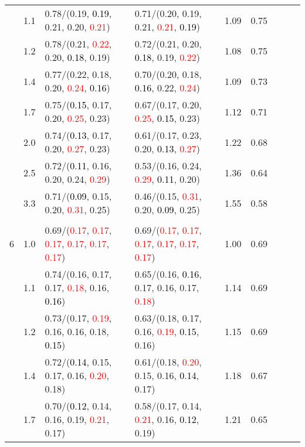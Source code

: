 \documentclass[10pt,a4paper]{report}
\begin{document}
\begin{table}[!htbp]
\begin{center}
{\begin{tabular}{ccllccccc}
			&1.1&0.78/(0.19, \textcolor{black}{0.19}, 0.21, 0.20, \textcolor{red}{0.21})&0.71/(0.20, 0.19, 0.21, \textcolor{red}{0.21}, \textcolor{black}{0.19})&1.09&0.75\\
			&1.2&0.78/(0.21, \textcolor{red}{0.22}, 0.20, \textcolor{black}{0.18}, 0.19)&0.72/(0.21, 0.20, \textcolor{black}{0.18}, 0.19, \textcolor{red}{0.22})&1.08&0.75\\
			&1.4&0.77/(0.22, 0.18, 0.20, \textcolor{red}{0.24}, \textcolor{black}{0.16})&0.70/(0.20, 0.18, \textcolor{black}{0.16}, 0.22, \textcolor{red}{0.24})&1.09&0.73\\
			&1.7&0.75/(\textcolor{black}{0.15}, 0.17, 0.20, \textcolor{red}{0.25}, 0.23)&0.67/(0.17, 0.20, \textcolor{red}{0.25}, \textcolor{black}{0.15}, 0.23)&1.12&0.71\\
			&2.0&0.74/(\textcolor{black}{0.13}, 0.17, 0.20, \textcolor{red}{0.27}, 0.23)&0.61/(0.17, 0.23, 0.20, \textcolor{black}{0.13}, \textcolor{red}{0.27})&1.22&0.68\\
			&2.5&0.72/(\textcolor{black}{0.11}, 0.16, 0.20, 0.24, \textcolor{red}{0.29})&0.53/(0.16, 0.24, \textcolor{red}{0.29}, \textcolor{black}{0.11}, 0.20)&1.36&0.64\\
			&3.3&0.71/(\textcolor{black}{0.09}, 0.15, 0.20, \textcolor{red}{0.31}, 0.25)&0.46/(0.15, \textcolor{red}{0.31}, 0.20, \textcolor{black}{0.09}, 0.25)&1.55&0.58\\
			&&&&\\
			6			&1.0&0.69/(\textcolor{red}{0.17}, \textcolor{red}{0.17}, \textcolor{red}{0.17}, \textcolor{red}{0.17}, \textcolor{red}{0.17}, \textcolor{red}{0.17})&0.69/(\textcolor{red}{0.17}, \textcolor{red}{0.17}, \textcolor{red}{0.17}, \textcolor{red}{0.17}, \textcolor{red}{0.17}, \textcolor{red}{0.17})&1.00&0.69\\
			&1.1&0.74/(0.16, 0.17, 0.17, \textcolor{red}{0.18}, 0.16, \textcolor{black}{0.16})&0.65/(0.16, \textcolor{black}{0.16}, 0.17, 0.16, 0.17, \textcolor{red}{0.18})&1.14&0.69\\
			&1.2&0.73/(0.17, \textcolor{red}{0.19}, 0.16, 0.16, 0.18, \textcolor{black}{0.15})&0.63/(0.18, 0.17, 0.16, \textcolor{red}{0.19}, \textcolor{black}{0.15}, 0.16)&1.15&0.69\\
			&1.4&0.72/(\textcolor{black}{0.14}, 0.15, 0.17, 0.16, \textcolor{red}{0.20}, 0.18)&0.61/(0.18, \textcolor{red}{0.20}, 0.15, 0.16, \textcolor{black}{0.14}, 0.17)&1.18&0.67\\
			&1.7&0.70/(\textcolor{black}{0.12}, 0.14, 0.16, 0.19, \textcolor{red}{0.21}, 0.17)&0.58/(0.17, 0.14, \textcolor{red}{0.21}, 0.16, \textcolor{black}{0.12}, 0.19)&1.21&0.65\\

\end{tabular}}
\end{center}
\end{table}
\end{document}
